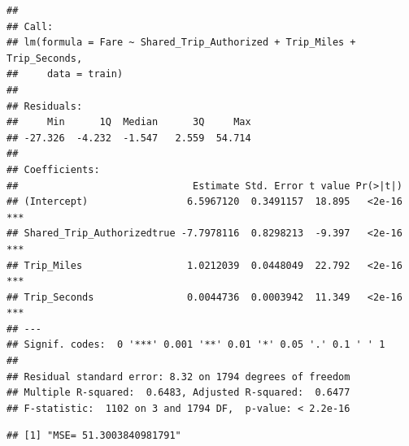\documentclass[
]{article}
\newenvironment{Shaded}{\begin{snugshade}}{\end{snugshade}}
\newcommand{\AttributeTok}[1]{\textcolor[rgb]{0.13,0.29,0.53}{#1}}
\newcommand{\DecValTok}[1]{\textcolor[rgb]{0.00,0.00,0.81}{#1}}
\newcommand{\FunctionTok}[1]{\textcolor[rgb]{0.13,0.29,0.53}{\textbf{#1}}}
\newcommand{\NormalTok}[1]{#1}
\newcommand{\OtherTok}[1]{\textcolor[rgb]{0.56,0.35,0.01}{#1}}
\newcommand{\SpecialCharTok}[1]{\textcolor[rgb]{0.81,0.36,0.00}{\textbf{#1}}}
\newcommand{\StringTok}[1]{\textcolor[rgb]{0.31,0.60,0.02}{#1}}
\begin{document}
\begin{verbatim}
## 
## Call:
## lm(formula = Fare ~ Shared_Trip_Authorized + Trip_Miles + Trip_Seconds, 
##     data = train)
## 
## Residuals:
##     Min      1Q  Median      3Q     Max 
## -27.326  -4.232  -1.547   2.559  54.714 
## 
## Coefficients:
##                              Estimate Std. Error t value Pr(>|t|)    
## (Intercept)                 6.5967120  0.3491157  18.895   <2e-16 ***
## Shared_Trip_Authorizedtrue -7.7978116  0.8298213  -9.397   <2e-16 ***
## Trip_Miles                  1.0212039  0.0448049  22.792   <2e-16 ***
## Trip_Seconds                0.0044736  0.0003942  11.349   <2e-16 ***
## ---
## Signif. codes:  0 '***' 0.001 '**' 0.01 '*' 0.05 '.' 0.1 ' ' 1
## 
## Residual standard error: 8.32 on 1794 degrees of freedom
## Multiple R-squared:  0.6483, Adjusted R-squared:  0.6477 
## F-statistic:  1102 on 3 and 1794 DF,  p-value: < 2.2e-16
\end{verbatim}

\begin{Shaded}
\end{Shaded}

\begin{verbatim}
## [1] "MSE= 51.3003840981791"
\end{verbatim}
\end{document}
